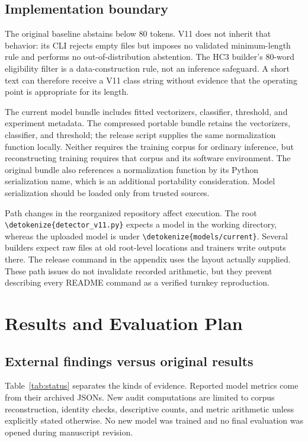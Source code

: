 \documentclass[11pt]{article}
\newcommand{\code}[1]{\expandafter\nolinkurl\expandafter{\detokenize{#1}}}
\begin{document}
\subsection{Implementation boundary}
The original baseline abstains below 80 tokens. V11 does not inherit that
behavior: its CLI rejects empty files but imposes no validated minimum-length
rule and performs no out-of-distribution abstention. The HC3 builder's
80-word eligibility filter is a data-construction rule, not an inference
safeguard. A short text can therefore receive a V11 class string without
evidence that the operating point is appropriate for its length.

The current model bundle includes fitted vectorizers, classifier, threshold,
and experiment metadata. The compressed portable bundle retains the
vectorizers, classifier, and threshold; the release script supplies the same
normalization function locally. Neither requires the training corpus for
ordinary inference, but reconstructing training requires that corpus and its
software environment. The original bundle also references a normalization
function by its Python serialization name, which is an additional portability
consideration. Model serialization should be loaded only from trusted sources.

Path changes in the reorganized repository affect execution. The root
\code{detector_v11.py} expects a model in the working directory, whereas
the uploaded model is under \code{models/current}. Several builders expect
raw files at old root-level locations and trainers write outputs there.
The release command in the appendix uses the layout actually supplied.
These path issues do not invalidate recorded arithmetic, but they prevent
describing every README command as a verified turnkey reproduction.

\section{Results and Evaluation Plan}
\subsection{External findings versus original results}
Table~\ref{tab:status} separates the kinds of evidence. Reported model
metrics come from their archived JSONs. New audit computations are limited
to corpus reconstruction, identity checks, descriptive counts, and metric
arithmetic unless explicitly stated otherwise. No new model was trained and
no final evaluation was opened during manuscript revision.
\end{document}
